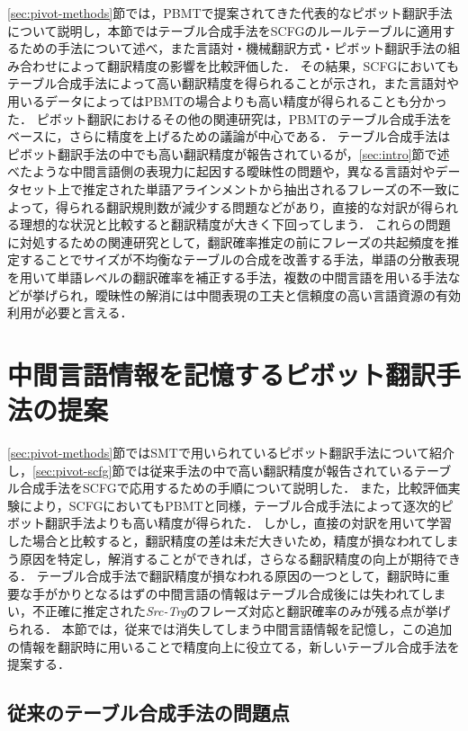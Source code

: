 \documentclass[japanese]{jnlp_1.4}
\begin{document}
\ref{sec:pivot-methods}節では，PBMTで提案されてきた代表的なピボット翻訳手法について説明し，本節ではテーブル合成手法をSCFGのルールテーブルに適用するための手法について述べ，また言語対・機械翻訳方式・ピボット翻訳手法の組み合わせによって翻訳精度の影響を比較評価した．
その結果，SCFGにおいてもテーブル合成手法によって高い翻訳精度を得られることが示され，また言語対や用いるデータによってはPBMTの場合よりも高い精度が得られることも分かった．
ピボット翻訳におけるその他の関連研究は，PBMTのテーブル合成手法をベースに，さらに精度を上げるための議論が中心である．
テーブル合成手法はピボット翻訳手法の中でも高い翻訳精度が報告されているが\cite{utiyama07}，\ref{sec:intro}節で述べたような中間言語側の表現力に起因する曖昧性の問題や，異なる言語対やデータセット上で推定された単語アラインメントから抽出されるフレーズの不一致によって，得られる翻訳規則数が減少する問題などがあり，直接的な対訳が得られる理想的な状況と比較すると翻訳精度が大きく下回ってしまう．
これらの問題に対処するための関連研究として，翻訳確率推定の前にフレーズの共起頻度を推定することでサイズが不均衡なテーブルの合成を改善する手法\cite{zhu14}，単語の分散表現を用いて単語レベルの翻訳確率を補正する手法\cite{levinboim15}，複数の中間言語を用いる手法\cite{dabre15}などが挙げられ，曖昧性の解消には中間表現の工夫と信頼度の高い言語資源の有効利用が必要と言える．


\section{中間言語情報を記憶するピボット翻訳手法の提案}
\label{sec:triangulation-mscfg}

\ref{sec:pivot-methods}節ではSMTで用いられているピボット翻訳手法について紹介し，\ref{sec:pivot-scfg}節では従来手法の中で高い翻訳精度が報告されているテーブル合成手法をSCFGで応用するための手順について説明した．
また，比較評価実験により，SCFGにおいてもPBMTと同様，テーブル合成手法によって逐次的ピボット翻訳手法よりも高い精度が得られた．
しかし，直接の対訳を用いて学習した場合と比較すると，翻訳精度の差は未だ大きいため，精度が損なわれてしまう原因を特定し，解消することができれば，さらなる翻訳精度の向上が期待できる．
テーブル合成手法で翻訳精度が損なわれる原因の一つとして，翻訳時に重要な手がかりとなるはずの中間言語の情報はテーブル合成後には失われてしまい，不正確に推定された\textit{Src-Trg}のフレーズ対応と翻訳確率のみが残る点が挙げられる．
本節では，従来では消失してしまう中間言語情報を記憶し，この追加の情報を翻訳時に用いることで精度向上に役立てる，新しいテーブル合成手法を提案する．


\subsection{従来のテーブル合成手法の問題点}
\end{document}
